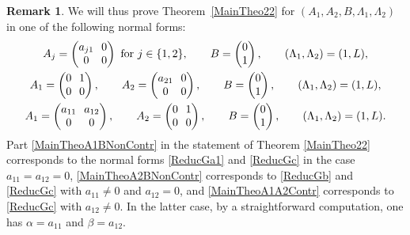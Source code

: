 \documentclass[JEP,XML,SOM,Unicode]{cedram}
\theoremstyle{plain}
\theoremstyle{definition}
\newtheorem{remk}[theo]{Remark}
\begin{document}
\begin{remk}
We will thus prove Theorem~\ref{MainTheo22} for $(A_1, A_2, B, \Lambda_1, \Lambda_2) $ in one of the following normal forms:
\begin{gather}
\label{ReducGa1}\arraycolsep3.5pt
A_j = \begin{pmatrix}
a_{j1} & 0 \\
0 & 0 \\
\end{pmatrix} \text{ for } j \in \{1, 2\}, \qquad B = \begin{pmatrix}
0 \\
1 \\
\end{pmatrix}, \qquad (\Lambda_1, \Lambda_2) = (1, L),
\\
\label{ReducGb}\arraycolsep3.5pt
A_1 = \begin{pmatrix}
0 & 1 \\
0 & 0 \\
\end{pmatrix}, \qquad A_2 = \begin{pmatrix}
a_{21} & 0 \\
0 & 0 \\
\end{pmatrix}, \qquad B = \begin{pmatrix}
0 \\
1 \\
\end{pmatrix}, \qquad (\Lambda_1, \Lambda_2) = (1, L),
\\
\label{ReducGc}\arraycolsep3.5pt
A_1 = \begin{pmatrix}
a_{11} & a_{12} \\
0 & 0 \\
\end{pmatrix}, \qquad A_2 = \begin{pmatrix}
0 & 1 \\
0 & 0 \\
\end{pmatrix}, \qquad B = \begin{pmatrix}
0 \\
1 \\
\end{pmatrix}, \qquad (\Lambda_1, \Lambda_2) = (1, L).
\end{gather}
Part \eqref{MainTheoA1BNonContr} in the statement of Theorem \ref{MainTheo22} corresponds to the normal forms \eqref{ReducGa1} and \eqref{ReducGc} in the case $a_{11} = a_{12} = 0$, \eqref{MainTheoA2BNonContr} corresponds to \eqref{ReducGb} and \eqref{ReducGc} with $a_{11} \neq 0$ and $a_{12} = 0$, and \eqref{MainTheoA1A2Contr} corresponds to \eqref{ReducGc} with $a_{12} \neq 0$. In the latter case, by a straightforward computation, one has $\alpha = a_{11}$ and $\beta = a_{12}$.
\end{remk}
\end{document}
